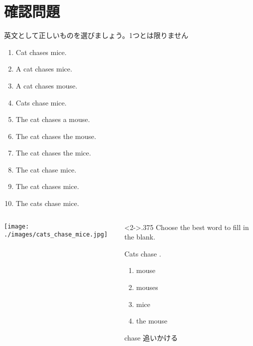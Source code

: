 \documentclass[aspectratio=169,xcolor={dvipsnames,table}]{beamer}
\begin{document}
\section{確認問題}
\begin{frame}[plain]
 
英文として正しいものを選びましょう。1つとは限りません

\begin{enumerate}
 \item Cat chases mice.
 \item A cat chases mice.
 \item A cat chases mouse.
 \item Cats chase mice.\visible<5->{〇}
  \item The cat chases a mouse.
 \item The cat chases the mouse.
 \item The cat chases the mice.
 \item The cat chase mice.
\item The cat chases mice.\visible<10->{〇}
 \item The cats chase mice.
\end{enumerate}
\end{frame}
\begin{frame}[plain]{}

\begin{columns}
\begin{column}{.5\textwidth}
 \texttt{[image: ./images/cats\_chase\_mice.jpg]}
\end{column}
\begin{column}<2->{.375\textwidth}\large
{\small Choose the best word to fill in the blank.}

\bigskip

\bigskip

\hfill{}Cats chase .

\bigskip

\bigskip

\begin{tcolorbox}
\begin{enumerate}
 \item mouse
 \item mouses
 \item mice
 \item the mouse
\end{enumerate}
\end{tcolorbox}


\bigskip

\bigskip

\hfill{\scriptsize chase   追いかける}
\end{column}
\end{columns}
\end{frame}
\end{document}

